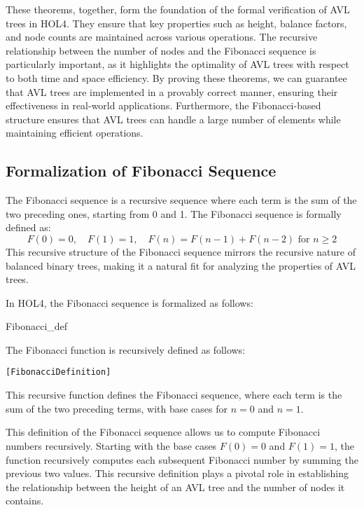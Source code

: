 These theorems, together, form the foundation of the formal verification of AVL trees in HOL4. They ensure that key properties such as height, balance factors, and node counts are maintained across various operations. The recursive relationship between the number of nodes and the Fibonacci sequence is particularly important, as it highlights the optimality of AVL trees with respect to both time and space efficiency. By proving these theorems, we can guarantee that AVL trees are implemented in a provably correct manner, ensuring their effectiveness in real-world applications. Furthermore, the Fibonacci-based structure ensures that AVL trees can handle a large number of elements while maintaining efficient operations.

\subsection{Formalization of Fibonacci Sequence}

    The Fibonacci sequence is a recursive sequence where each term is the sum of the two preceding ones, starting from 0 and 1. The Fibonacci sequence is formally defined as:
    \[
    F(0) = 0, \quad F(1) = 1, \quad F(n) = F(n-1) + F(n-2) \text{ for } n \geq 2
    \]
    This recursive structure of the Fibonacci sequence mirrors the recursive nature of balanced binary trees, making it a natural fit for analyzing the properties of AVL trees.

    In HOL4, the Fibonacci sequence is formalized as follows:
   \begin{defn}{Fibonacci\_def}

    The Fibonacci function is recursively defined as follows:

     \begin{alltt}
     	[Fibonacci Definition]
     \end{alltt}
     

    This recursive function defines the Fibonacci sequence, where each term is the sum of the two preceding terms, with base cases for \( n = 0 \) and \( n = 1 \).
    \end{defn}


    This definition of the Fibonacci sequence allows us to compute Fibonacci numbers recursively. Starting with the base cases \( F(0) = 0 \) and \( F(1) = 1 \), the function recursively computes each subsequent Fibonacci number by summing the previous two values. This recursive definition plays a pivotal role in establishing the relationship between the height of an AVL tree and the number of nodes it contains.


